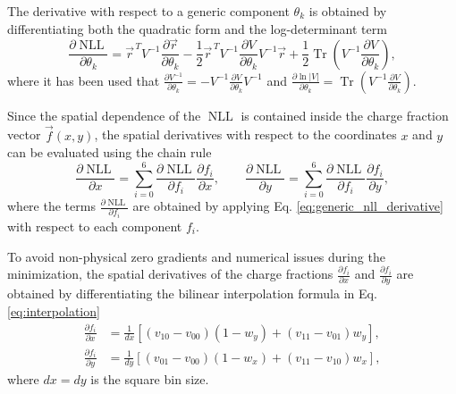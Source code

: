 The derivative with respect to a generic component $\theta_k$ is obtained by differentiating both the quadratic form and the log-determinant term
\begin{equation}
\frac{\partial \operatorname{NLL}}{\partial \theta_k} = \vec{r}^{\,T} V^{-1} \frac{\partial \vec{r}}{\partial \theta_k} - \frac{1}{2} \vec{r}^{\,T} V^{-1} \frac{\partial V}{\partial \theta_k} V^{-1} \vec{r} + \frac{1}{2} \operatorname{Tr} \left( V^{-1} \frac{\partial V}{\partial \theta_k} \right),
\label{eq:generic_nll_derivative}
\end{equation}
where it has been used that $\frac{\partial V^{-1}}{\partial \theta_k} = - V^{-1} \frac{\partial V}{\partial \theta_k} V^{-1}$ and $\frac{\partial \ln |V|}{\partial \theta_k} = \operatorname{Tr} \left( V^{-1} \frac{\partial V}{\partial \theta_k} \right)$.

Since the spatial dependence of the $\operatorname{NLL}$ is contained inside the charge fraction vector $\vec{f}(x, y)$, the spatial derivatives with respect to the coordinates $x$ and $y$ can be evaluated using the chain rule
\begin{equation}
\frac{\partial \operatorname{NLL}}{\partial x} = \sum_{i=0}^6 \frac{\partial \operatorname{NLL}}{\partial f_i} \frac{\partial f_i}{\partial x}, \quad \quad \frac{\partial \operatorname{NLL}}{\partial y} = \sum_{i=0}^6 \frac{\partial \operatorname{NLL}}{\partial f_i} \frac{\partial f_i}{\partial y},
\label{eq:nll_chain_rule}
\end{equation}
where the terms $\frac{\partial \operatorname{NLL}}{\partial f_i}$ are obtained by applying Eq. \ref{eq:generic_nll_derivative} with respect to each component $f_i$.

To avoid non-physical zero gradients and numerical issues during the minimization, the spatial derivatives of the charge fractions $\frac{\partial f_i}{\partial x}$ and $\frac{\partial f_i}{\partial y}$ are obtained by differentiating the bilinear interpolation formula in Eq. \ref{eq:interpolation}
\begin{equation}
\begin{split}
\frac{\partial f_i}{\partial x} &= \frac{1}{dx} \left[ (v_{10} - v_{00}) (1 - w_y) + (v_{11} - v_{01}) w_y \right], \\
\frac{\partial f_i}{\partial y} &= \frac{1}{dy} \left[ (v_{01} - v_{00}) (1 - w_x) + (v_{11} - v_{10}) w_x \right],
\end{split}
\end{equation}
where $dx = dy$ is the square bin size.

